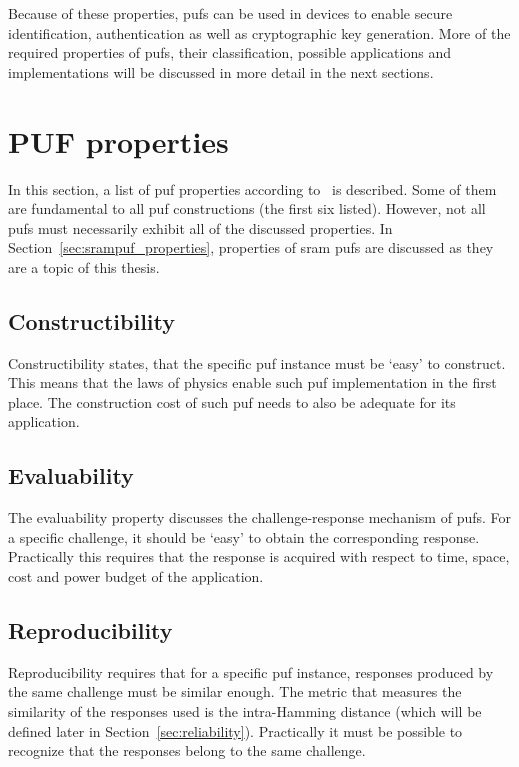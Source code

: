 Because of these properties, \glspl{puf} can be used in devices to enable secure identification, authentication as well as cryptographic key generation. More of the required properties of \glspl{puf}, their classification, possible applications and implementations will be discussed in more detail in the next sections.


\section{PUF properties}\label{sec:properties}

In this section, a list of \gls{puf} properties according to~\cite{Maes2012} is described. Some of them are fundamental to all \gls{puf} constructions (the first six listed). However, not all \glspl{puf} must necessarily exhibit all of the discussed properties. In Section~\ref{sec:srampuf_properties}, properties of \gls{sram} \glspl{puf} are discussed as they are a topic of this thesis.

\subsection*{Constructibility}

Constructibility states, that the specific \gls{puf} instance must be `easy' to construct. This means that the laws of physics enable such \gls{puf} implementation in the first place. The construction cost of such \gls{puf} needs to also be adequate for its application.

\subsection*{Evaluability}

The evaluability property discusses the challenge-response mechanism of \glspl{puf}. For a specific challenge, it should be `easy' to obtain the corresponding response. Practically this requires that the response is acquired with respect to time, space, cost and power budget of the application.

\subsection*{Reproducibility}\label{sec:reproducibility}

Reproducibility requires that for a specific \gls{puf} instance, responses produced by the same challenge must be similar enough. The metric that measures the similarity of the responses used is the intra-Hamming distance (which will be defined later in Section~\ref{sec:reliability}). Practically it must be possible to recognize that the responses belong to the same challenge.

